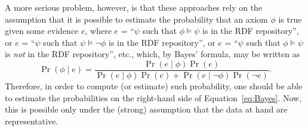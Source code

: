 \documentclass{llncs}
\begin{document}
A more serious problem, however, is that these approaches rely on the assumption
that it is possible to estimate the probability that an axiom $\phi$ is true given
some evidence $e$, where $e$ = ``$\psi$ such that $\phi\models\psi$ is in the RDF repository'',
or $e$ = ``$\psi$ such that $\psi\models\neg\phi$ is in the RDF repository'',
or $e$ = ``$\psi$ such that $\phi\models\psi$ is \emph{not} in the RDF repository'', etc.,
which, by Bayes' formula, may be written as
\begin{equation}\label{eq:Bayes}
  \Pr(\phi \mid e) = \frac{\Pr(e \mid \phi)\Pr(e)}{\Pr(e \mid \phi)\Pr(e) + \Pr(e \mid \neg\phi)\Pr(\neg e)}.
\end{equation}
Therefore, in order to compute (or estimate) such probability, one should be able
to estimate the probabilities on the right-hand side of Equation~\ref{eq:Bayes}.
Now, this is possible only under the (strong) assumption that the data at hand
are representative.
\end{document}
